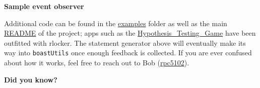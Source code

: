 \documentclass[
]{book}
\newenvironment{Shaded}{\begin{snugshade}}{\end{snugshade}}
\newcommand{\CommentTok}[1]{\textcolor[rgb]{0.56,0.35,0.01}{\textit{#1}}}
\newcommand{\DataTypeTok}[1]{\textcolor[rgb]{0.13,0.29,0.53}{#1}}
\newcommand{\KeywordTok}[1]{\textcolor[rgb]{0.13,0.29,0.53}{\textbf{#1}}}
\newcommand{\NormalTok}[1]{#1}
\newcommand{\OperatorTok}[1]{\textcolor[rgb]{0.81,0.36,0.00}{\textbf{#1}}}
\newcommand{\OtherTok}[1]{\textcolor[rgb]{0.56,0.35,0.01}{#1}}
\newcommand{\StringTok}[1]{\textcolor[rgb]{0.31,0.60,0.02}{#1}}
\begin{document}
\textbf{Sample event observer}

\begin{Shaded}
\end{Shaded}

Additional code can be found in the \href{https://github.com/rpc5102/rlocker/tree/master/inst/examples}{examples} folder as well as the main \href{https://github.com/rpc5102/rlocker/blob/master/README.md}{README} of the project; apps such as the \href{https://github.com/EducationShinyAppTeam/Hypothesis_Testing_Game}{Hypothesis\_Testing\_Game} have been outfitted with rlocker. The statement generator above will eventually make its way into \texttt{boastUtils} once enough feedback is collected. If you are ever confused about how it works, feel free to reach out to Bob (\href{mailto:rpc5102@psu.edu}{rpc5102}).

\textbf{Did you know?}
\end{document}

